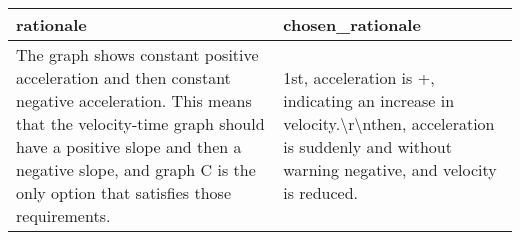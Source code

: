 \begin{tabular}{p{7cm}|p{7cm}}
\toprule
                                                                                                                                                                                                                                                 rationale &                                                                                                                                      chosen\_rationale \\
\midrule
 The graph shows constant positive acceleration and then constant negative acceleration. This means that the velocity-time graph should have a positive slope and then a negative slope, and graph C is the only option that satisfies those requirements. &  1st, acceleration is +, indicating an increase in velocity.\textbackslash r\textbackslash nthen, acceleration is suddenly and without warning negative, and velocity is reduced. \\
\bottomrule
\end{tabular}
